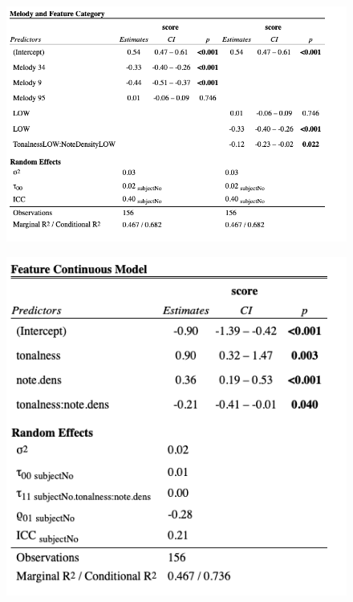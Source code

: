 \documentclass[12pt,]{book}
\begin{document}
\begin{figure}

{\centering \includegraphics[width=1\linewidth]{img/metable2} 

}

\end{figure}

\begin{figure}

{\centering \includegraphics[width=1\linewidth]{img/metable3} 

}

\end{figure}
\end{document}
